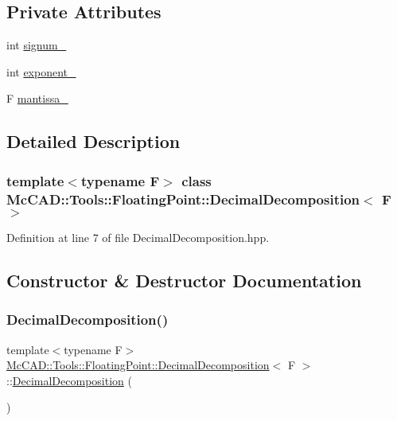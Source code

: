 \subsection*{Private Attributes}
\begin{DoxyCompactItemize}
\item 
int \hyperlink{classMcCAD_1_1Tools_1_1FloatingPoint_1_1DecimalDecomposition_a43f9b3dfaed90222862ab60d288f4337}{signum\+\_\+}
\item 
int \hyperlink{classMcCAD_1_1Tools_1_1FloatingPoint_1_1DecimalDecomposition_a96a64ac9e0ec8c78a15c257334dbb305}{exponent\+\_\+}
\item 
F \hyperlink{classMcCAD_1_1Tools_1_1FloatingPoint_1_1DecimalDecomposition_aa9b7ae6aa5ed3bf3a256e0d8a8a7c52d}{mantissa\+\_\+}
\end{DoxyCompactItemize}


\subsection{Detailed Description}
\subsubsection*{template$<$typename F$>$\newline
class Mc\+C\+A\+D\+::\+Tools\+::\+Floating\+Point\+::\+Decimal\+Decomposition$<$ F $>$}



Definition at line 7 of file Decimal\+Decomposition.\+hpp.



\subsection{Constructor \& Destructor Documentation}
\mbox{\label{classMcCAD_1_1Tools_1_1FloatingPoint_1_1DecimalDecomposition_a2f5c3902e65d030ea53f0cb7feb8e5f4}} 
\subsubsection{\texorpdfstring{Decimal\+Decomposition()}{DecimalDecomposition()}\hspace{0.1cm}{\footnotesize\ttfamily [1/2]}}
{\footnotesize\ttfamily template$<$typename F$>$ \\
\hyperlink{classMcCAD_1_1Tools_1_1FloatingPoint_1_1DecimalDecomposition}{Mc\+C\+A\+D\+::\+Tools\+::\+Floating\+Point\+::\+Decimal\+Decomposition}$<$ F $>$\+::\hyperlink{classMcCAD_1_1Tools_1_1FloatingPoint_1_1DecimalDecomposition}{Decimal\+Decomposition} (\begin{DoxyParamCaption}{ }\end{DoxyParamCaption})}

